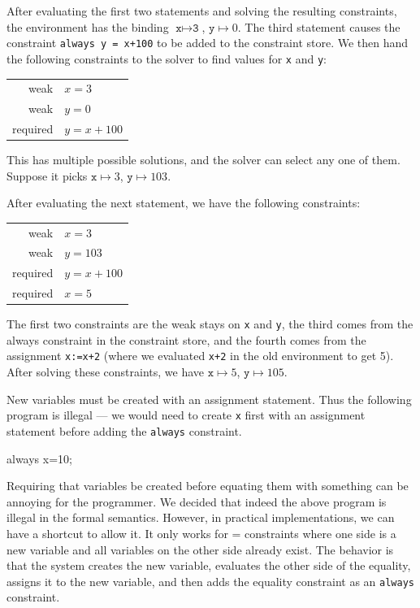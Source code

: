 \documentclass{article}
\begin{document}
After evaluating the first two statements and solving the resulting
constraints, the environment has the binding 
$\texttt{x} \mapsto \texttt{3}$, $\texttt{y} \mapsto 0$.  The third
statement causes the constraint \verb|always y = x+100| to be added to
the constraint store.  We then hand the following constraints to the
solver to find values for \texttt{x} and \texttt{y}:

\begin{tabular}{rl}
weak     & $x=3$ \\
weak     & $y=0$ \\
required & $y=x+100$
\end{tabular}

This has multiple possible solutions, and the solver can select any
one of them.  Suppose it picks $\texttt{x} \mapsto 3$, 
$\texttt{y} \mapsto 103$.

After evaluating the next statement, we have the following constraints:

\begin{tabular}{rl}
weak     & $x=3$ \\
weak     & $y=103$ \\
required & $y=x+100$ \\
required & $x=5$
\end{tabular}

The first two constraints are the weak stays on \verb|x| and \verb|y|,
the third comes from the always constraint in the constraint store,
and the fourth comes from the assignment \verb|x:=x+2| (where we
evaluated \verb|x+2| in the old environment to get 5).  After solving
these constraints, we have $\texttt{x} \mapsto 5$, 
$\texttt{y} \mapsto 105$.

New variables must be created with an assignment statement.  Thus
the following program is illegal --- we would need to create
\verb|x| first with an assignment statement before adding the
\verb|always| constraint.
\begin{example}
always x=10;
\end{example}

Requiring that variables be created before equating them with
something can be annoying for the programmer.  We decided that indeed
the above program is illegal in the formal semantics.  However, in
practical implementations, we can have a shortcut to allow it.  It
only works for = constraints where one side is a new variable and
all variables on the other side already exist.  The behavior is
that the system creates the new variable, evaluates the other side
of the equality, assigns it to the new variable, and then adds the
equality constraint as an \verb|always| constraint.
\end{document}
